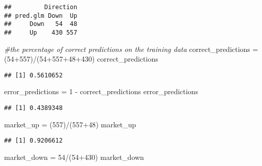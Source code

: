 \documentclass[
]{article}
\newenvironment{Shaded}{\begin{snugshade}}{\end{snugshade}}
\newcommand{\CommentTok}[1]{\textcolor[rgb]{0.56,0.35,0.01}{\textit{#1}}}
\newcommand{\DecValTok}[1]{\textcolor[rgb]{0.00,0.00,0.81}{#1}}
\newcommand{\NormalTok}[1]{#1}
\newcommand{\OtherTok}[1]{\textcolor[rgb]{0.56,0.35,0.01}{#1}}
\newcommand{\SpecialCharTok}[1]{\textcolor[rgb]{0.00,0.00,0.00}{#1}}
\begin{document}
\begin{verbatim}
##         Direction
## pred.glm Down  Up
##     Down   54  48
##     Up    430 557
\end{verbatim}

\begin{Shaded}
\begin{Highlighting}[]
\CommentTok{\#the percentage of correct predictions on the training data}
\NormalTok{correct\_predictions }\OtherTok{=}\NormalTok{ (}\DecValTok{54}\SpecialCharTok{+}\DecValTok{557}\NormalTok{)}\SpecialCharTok{/}\NormalTok{(}\DecValTok{54}\SpecialCharTok{+}\DecValTok{557}\SpecialCharTok{+}\DecValTok{48}\SpecialCharTok{+}\DecValTok{430}\NormalTok{)}
\NormalTok{correct\_predictions}
\end{Highlighting}
\end{Shaded}

\begin{verbatim}
## [1] 0.5610652
\end{verbatim}

\begin{Shaded}
\begin{Highlighting}[]
\NormalTok{error\_predictions }\OtherTok{=} \DecValTok{1} \SpecialCharTok{{-}}\NormalTok{ correct\_predictions}
\NormalTok{error\_predictions}
\end{Highlighting}
\end{Shaded}

\begin{verbatim}
## [1] 0.4389348
\end{verbatim}

\begin{Shaded}
\begin{Highlighting}[]
\NormalTok{market\_up }\OtherTok{=}\NormalTok{ (}\DecValTok{557}\NormalTok{)}\SpecialCharTok{/}\NormalTok{(}\DecValTok{557}\SpecialCharTok{+}\DecValTok{48}\NormalTok{)}
\NormalTok{market\_up}
\end{Highlighting}
\end{Shaded}

\begin{verbatim}
## [1] 0.9206612
\end{verbatim}

\begin{Shaded}
\begin{Highlighting}[]
\NormalTok{market\_down }\OtherTok{=} \DecValTok{54}\SpecialCharTok{/}\NormalTok{(}\DecValTok{54}\SpecialCharTok{+}\DecValTok{430}\NormalTok{)}
\NormalTok{market\_down}
\end{Highlighting}
\end{Shaded}
\end{document}
